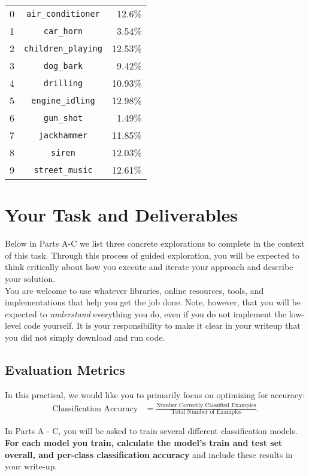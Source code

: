 \documentclass[12pt]{article}
\begin{document}
\begin{center}
\begin{tabular}{r c r}
    0 &\verb|air_conditioner| & 12.6\% \\
    1 &\verb|car_horn| & 3.54\% \\
    2 &\verb|children_playing| & 12.53\%\\
    3 &\verb|dog_bark| & 9.42\%\\
    4 &\verb|drilling| & 10.93\%\\
    5 &\verb|engine_idling| & 12.98\%    \\
    6 &\verb|gun_shot| & 1.49\%\\
    7 &\verb|jackhammer| & 11.85\%\\
    8 &\verb|siren| & 12.03\%\\
    9 &\verb|street_music| & 12.61\%
\end{tabular}
\end{center}

\section{Your Task and Deliverables}\label{section:task}

Below in Parts A-C we list three concrete explorations to complete in the context of this task.  Through this process of guided exploration, you will be expected to think critically about how you execute and iterate your approach and describe your solution.\\

\noindent You are welcome to use whatever libraries, online resources, tools, and implementations that help you get the job done. Note, however, that you will be expected to \emph{understand} everything you do, even if you do not implement the low-level code yourself.  It is your responsibility to make it clear in your writeup that you did not simply download and run code.


\subsection{Evaluation Metrics}
In this practical, we would like you to primarily focus on optimizing for accuracy: 
\begin{align*}
    \text{Classification Accuracy} &= \frac{\text{Number Correctly Classified Examples}}{\text{Total Number of Examples}}.
\end{align*}

\noindent In Parts A - C, you will be asked to train several different classification models.  \textbf{For each model you train, calculate the model's train and test set overall, and per-class classification accuracy} and include these results in your write-up.\\
\end{document}
